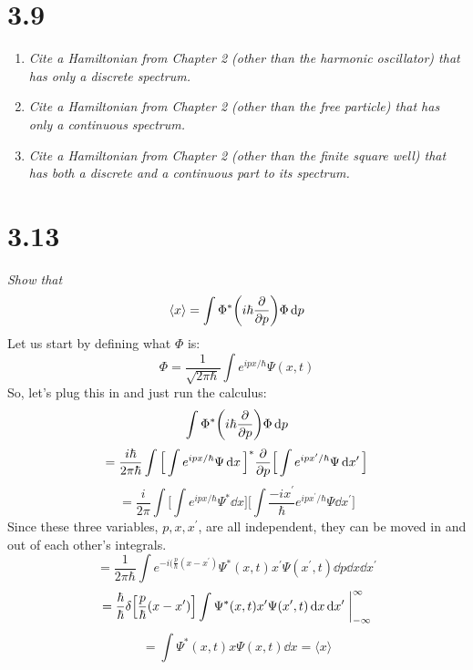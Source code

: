 \documentclass[12pt]{article}
\begin{document}
\newpage

\section*{3.9}
\begin{enumerate}[label=\alph*)]
\item \emph{Cite a Hamiltonian from Chapter 2 (other than the harmonic oscillator) that has only a discrete spectrum.}\bigskip

\item \emph{Cite a Hamiltonian from Chapter 2 (other than the free particle) that has only a continuous spectrum.}\bigskip

\item \emph{Cite a Hamiltonian from Chapter 2 (other than the finite square well) that has both a discrete and a continuous part to its spectrum.}
\end{enumerate}

\newpage

\section*{3.13}
\emph{Show that}
\[\langle x \rangle = \int \Phi^* \qty(i\hbar\pdv{p})\Phi \dd{p}\]\bigskip
Let us start by defining what $\Phi$ is:
\[\Phi = \frac{1}{\sqrt{2\pi \hbar}}\int e^{ipx/\hbar} \Psi(x,t)\]
So, let's plug this in and just run the calculus:
\[\int \Phi^* \qty(i\hbar\pdv{p})\Phi \dd{p}\]
\[= \frac{i\hbar}{2 \pi \hbar} \int \Big[\int e^{ipx/\hbar} \Psi \dd{x}\Big]^*\pdv{p}\Big[\int e^{ipx^\prime /\hbar} \Psi \dd{x^\prime}\Big]\]
\[=\frac{i}{2 \pi} \int \Big[\int e^{ipx/\hbar} \Psi^* \dd{x}\Big] \Big[\int \frac{-ix^\prime}{\hbar}e^{ipx^\prime/\hbar} \Psi \dd{x^\prime}\Big]\]
Since these three variables, $p, x, x^\prime$, are all independent, they can be moved in and out of each other's integrals. 
\[=\frac{1}{2 \pi \hbar} \int e^{-i(\frac{p}{\hbar}(x-x^\prime)} \Psi^*(x,t) x^\prime \Psi(x^\prime, t) \dd{p}\dd{x}\dd{x^\prime}\]
\[=\frac{\hbar}{\hbar} \delta\Big[\frac{p}{\hbar}(x-x^\prime)\Big]\int\Psi^*(x,t)x^\prime\Psi(x^\prime,t)\dd{x}\dd{x^\prime}\eval^\infty_{-\infty}\]
\[=\int \Psi^*(x,t)x\Psi(x,t)\dd{x} = \langle x \rangle\]

\newpage
\end{document}

